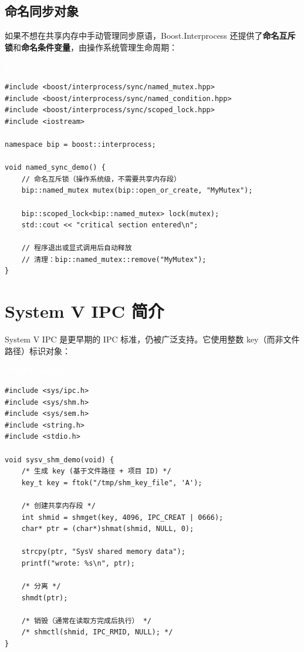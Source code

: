 \documentclass[12pt,a4paper,fontset=fandol]{ctexbook}
\newcommand{\cpplabel}{%
  \noindent\begin{tcolorbox}[sharp corners,colback=algheadbg,colframe=algheadbg,
    left=6pt,right=6pt,top=2pt,bottom=2pt,boxrule=0pt]
  \textcolor{white}{\small\bfseries\sffamily C++}\end{tcolorbox}%
}
\newcommand{\posixlabel}{%
  \noindent\begin{tcolorbox}[sharp corners,colback=posixheadbg,colframe=posixheadbg,
    left=6pt,right=6pt,top=2pt,bottom=2pt,boxrule=0pt]
  \textcolor{white}{\small\bfseries\sffamily POSIX Sockets}\end{tcolorbox}%
}
\begin{document}
\subsection{命名同步对象}

如果不想在共享内存中手动管理同步原语，Boost.Interprocess 还提供了\textbf{命名互斥锁}和\textbf{命名条件变量}，由操作系统管理生命周期：

\cpplabel
\begin{lstlisting}
#include <boost/interprocess/sync/named_mutex.hpp>
#include <boost/interprocess/sync/named_condition.hpp>
#include <boost/interprocess/sync/scoped_lock.hpp>
#include <iostream>

namespace bip = boost::interprocess;

void named_sync_demo() {
    // 命名互斥锁（操作系统级，不需要共享内存段）
    bip::named_mutex mutex(bip::open_or_create, "MyMutex");

    bip::scoped_lock<bip::named_mutex> lock(mutex);
    std::cout << "critical section entered\n";

    // 程序退出或显式调用后自动释放
    // 清理：bip::named_mutex::remove("MyMutex");
}
\end{lstlisting}

\section{System V IPC 简介}

System V IPC 是更早期的 IPC 标准，仍被广泛支持。它使用整数 key（而非文件路径）标识对象：

\posixlabel
\begin{lstlisting}[style=cstyle]
#include <sys/ipc.h>
#include <sys/shm.h>
#include <sys/sem.h>
#include <string.h>
#include <stdio.h>

void sysv_shm_demo(void) {
    /* 生成 key (基于文件路径 + 项目 ID) */
    key_t key = ftok("/tmp/shm_key_file", 'A');

    /* 创建共享内存段 */
    int shmid = shmget(key, 4096, IPC_CREAT | 0666);
    char* ptr = (char*)shmat(shmid, NULL, 0);

    strcpy(ptr, "SysV shared memory data");
    printf("wrote: %s\n", ptr);

    /* 分离 */
    shmdt(ptr);

    /* 销毁（通常在读取方完成后执行） */
    /* shmctl(shmid, IPC_RMID, NULL); */
}
\end{lstlisting}
\end{document}
